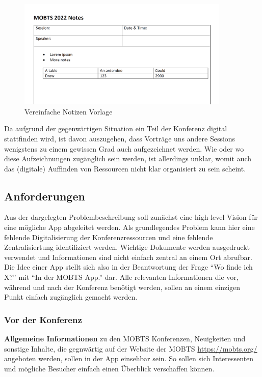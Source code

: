 \begin{figure}
    \begin{center}
        \includegraphics[width=0.9\textwidth]{img/notes_template.PNG}
    
    \end{center}
    \caption{Vereinfache Notizen Vorlage}
    \label{fig:notes-template}
\end{figure}

Da aufgrund der gegenwärtigen Situation ein Teil der Konferenz digital stattfinden wird, ist davon auszugehen, dass Vorträge uns andere Sessions wenigstens zu einem gewissen Grad auch aufgezeichnet werden.
Wie oder wo diese Aufzeichnungen zugänglich sein werden, ist allerdings unklar, womit auch das (digitale) Auffinden von Ressourcen nicht klar organisiert zu sein scheint. 

\subsection{Anforderungen}
Aus der dargelegten Problembeschreibung soll zunächst eine high-level Vision für eine mögliche App abgeleitet werden.
Als grundlegendes Problem kann hier eine fehlende Digitalisierung der Konferenzressourcen und eine fehlende Zentralisiertung identifiziert werden.
Wichtige Dokumente werden ausgedruckt verwendet und Informationen sind nicht einfach zentral an einem Ort abrufbar.
Die Idee einer App stellt sich also in der Beantwortung der Frage \enquote{Wo finde ich X?} mit \enquote{In der \ac{MOBTS} App.} dar.
Alle relevanten Informationen die vor, während und nach der Konferenz benötigt werden, sollen an einem einzigen Punkt einfach zugänglich gemacht werden.

\subsubsection*{Vor der Konferenz}
\textbf{Allgemeine Informationen} zu den \ac{MOBTS} Konferenzen, Neuigkeiten und sonstige Inhalte, die gegnwärtig auf der Website der \ac{MOBTS} \url{https://mobts.org/} angeboten werden, sollen in der App einsehbar sein.
So sollen sich Interessenten und mögliche Besucher einfach einen Überblick verschaffen können.

